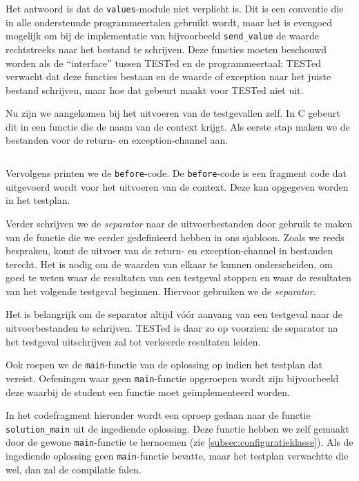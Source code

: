 Het antwoord is dat de \texttt{values}-module niet verplicht is.
Dit is een conventie die in alle ondersteunde programmeertalen gebruikt wordt, maar het is evengoed mogelijk om bij de implementatie van bijvoorbeeld \texttt{send\_value} de waarde rechtstreeks naar het bestand te schrijven.
Deze functies moeten beschouwd worden als de ``interface'' tussen TESTed en de programmeertaal: TESTed verwacht dat deze functies bestaan en de waarde of exception naar het juiste bestand schrijven, maar hoe dat gebeurt maakt voor TESTed niet uit.

Nu zijn we aangekomen bij het uitvoeren van de testgevallen zelf.
In C gebeurt dit in een functie die de naam van de context krijgt.
Als eerste stap maken we de bestanden voor de return- en exception-channel aan.

\inputminted[firstline=33,lastline=36]{mako}{sources/c-context.mako}

Vervolgens printen we de \texttt{before}-code.
De \texttt{before}-code is een fragment code dat uitgevoerd wordt voor het uitvoeren van de context.
Deze kan opgegeven worden in het testplan.

Verder schrijven we de \emph{separator} naar de uitvoerbestanden door gebruik te maken van de functie die we eerder gedefinieerd hebben in ons sjabloon.
Zoals we reeds bespraken, komt de uitvoer van de return- en exception-channel in bestanden terecht.
Het is nodig om de waarden van elkaar te kunnen onderscheiden, om goed te weten waar de resultaten van een testgeval stoppen en waar de resultaten van het volgende testgeval beginnen.
Hiervoor gebruiken we de \emph{separator}.

Het is belangrijk om de separator altijd vóór aanvang van een testgeval naar de uitvoerbestanden te schrijven.
TESTed is daar zo op voorzien: de separator na het testgeval uitschrijven zal tot verkeerde resultaten leiden.

Ook roepen we de \texttt{main}-functie van de oplossing op indien het testplan dat vereist.
Oefeningen waar geen \texttt{main}-functie opgeroepen wordt zijn bijvoorbeeld deze waarbij de student een functie moet geïmplementeerd worden.

In het codefragment hieronder wordt een oproep gedaan naar de functie \texttt{solution\_main} uit de ingediende oplossing.
Deze functie hebben we zelf gemaakt door de gewone \texttt{main}-functie te hernoemen (zie \cref{subsec:configuratieklasse}).
Als de ingediende oplossing geen \texttt{main}-functie bevatte, maar het testplan verwachtte die wel, dan zal de compilatie falen.

